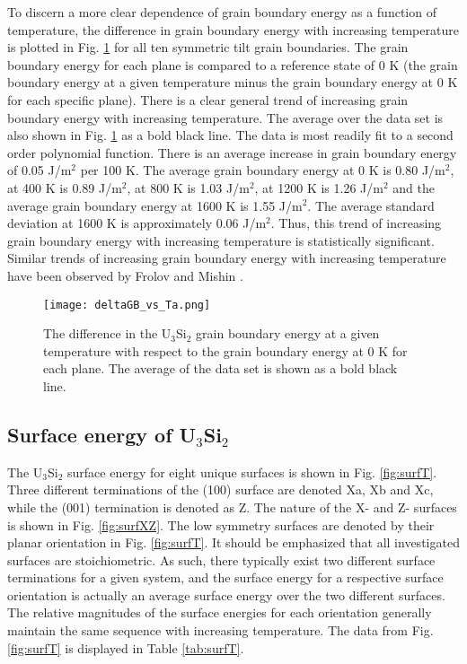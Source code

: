 \documentclass[review]{elsarticle}
\begin{document}
To discern a more clear dependence of grain boundary energy as a function of temperature, the difference in grain boundary energy with increasing temperature is plotted in Fig. \ref{fig:gbdeltaT} for all ten symmetric tilt grain boundaries. The grain boundary energy for each plane is compared to a reference state of 0 K (the grain boundary energy at a given temperature minus the grain boundary energy at 0 K for each specific plane). There is a clear general trend of increasing grain boundary energy with increasing temperature. The average over the data set is also shown in Fig. \ref{fig:gbdeltaT} as a bold black line. The data is most readily fit to a second order polynomial function. There is an average increase in grain boundary energy of 0.05 J/m$^{2}$ per 100 K. The average grain boundary energy at 0 K is 0.80 J/m$^{2}$, at 400 K is 0.89 J/m$^{2}$, at 800 K is 1.03 J/m$^{2}$, at 1200 K is 1.26 J/m$^{2}$ and the average grain boundary energy at 1600 K is 1.55 J/m$^{2}$. The average standard deviation at 1600 K is approximately 0.06 J/m$^{2}$. Thus, this trend of increasing grain boundary energy with increasing temperature is statistically significant. Similar trends of increasing grain boundary energy with increasing temperature have been observed by Frolov and Mishin \cite{frolov2012}. 
 
 \begin{figure}[h]
 \centering
 \texttt{[image: deltaGB\_vs\_Ta.png]} 
 \caption{The difference in the U$_{3}$Si$_{2}$ grain boundary energy at a given temperature with respect to the grain boundary energy at 0 K for each plane. The average of the data set is shown as a bold black line. }
 \label{fig:gbdeltaT}
\end{figure}


\FloatBarrier

\subsection{Surface energy of U$_{3}$Si$_{2}$}

The U$_{3}$Si$_{2}$ surface energy for eight unique surfaces is shown in Fig. \ref{fig:surfT}. Three different terminations of the (100) surface are denoted Xa, Xb and Xc, while the (001) termination is denoted as Z. The nature of the X- and Z- surfaces is shown in Fig. \ref{fig:surfXZ}. The low symmetry surfaces are denoted by their planar orientation in Fig. \ref{fig:surfT}. It should be emphasized that all investigated surfaces are stoichiometric. As such, there typically exist two different surface terminations for a given system, and the surface energy for a respective surface orientation is actually an average surface energy over the two different surfaces. The relative magnitudes of the surface energies for each orientation generally maintain the same sequence with increasing temperature. The data from Fig. \ref{fig:surfT} is displayed in Table \ref{tab:surfT}.
\end{document}

